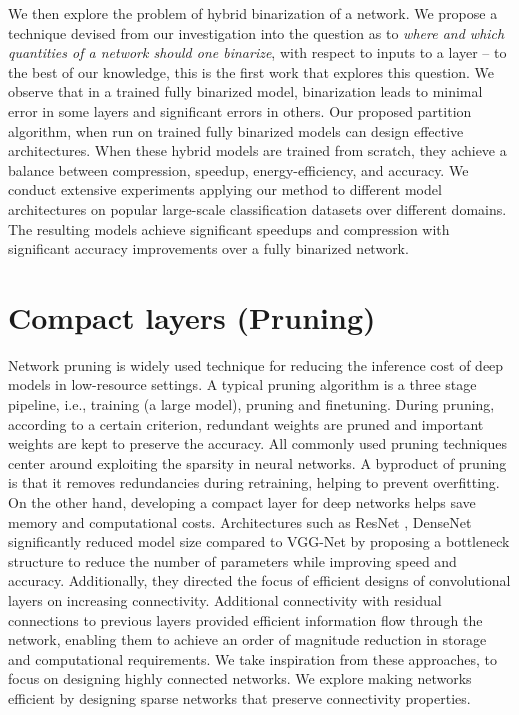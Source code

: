 \noindent We then explore the problem of hybrid binarization of a network. We propose a technique devised from our investigation into the question as to {\it where and which quantities of a network should one binarize}, with respect to inputs to a layer -- to the best of our knowledge, this is the first work that explores this question. We observe that in a trained fully binarized model, binarization leads to minimal error in some layers and significant errors in others. Our proposed partition algorithm, when run on trained fully binarized models can design effective architectures. When these hybrid models are trained from scratch, they  achieve a balance between compression, speedup, energy-efficiency, and accuracy. We conduct extensive experiments applying our method to different model architectures on popular large-scale classification datasets over different domains. The resulting models achieve significant speedups and compression with significant accuracy improvements over a fully binarized network.

\section{Compact layers (Pruning)}

\noindent Network pruning is widely used technique for reducing the inference cost of deep  models  in  low-resource  settings.  A  typical  pruning  algorithm  is  a  three stage pipeline,  i.e.,  training  (a  large  model),  pruning  and  finetuning.   During  pruning, according to a certain criterion, redundant weights are pruned and important weights are kept to preserve the accuracy. All commonly used pruning techniques center around exploiting the sparsity in neural networks. A byproduct of pruning is that it removes redundancies during retraining, helping to prevent overfitting.\\

\noindent On the other hand, developing a compact layer for deep networks helps save memory and computational costs. Architectures such as ResNet \cite{he2016deep}, DenseNet \cite{huang2017densely} significantly reduced model size compared to VGG-Net by proposing a bottleneck structure to reduce the number of parameters while improving speed and accuracy. Additionally, they directed the focus of efficient designs of convolutional layers on increasing connectivity. Additional connectivity with residual connections to previous layers provided efficient information flow through the network, enabling them to achieve an order of magnitude reduction in storage and computational requirements. We take inspiration from these approaches, to focus on designing highly connected networks. We explore making networks efficient by designing sparse networks that preserve connectivity properties. \\

